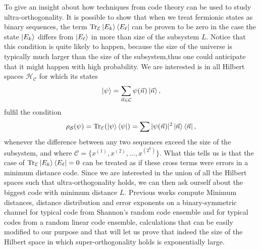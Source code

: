 \indent To give an insight about how techniques from code theory can be used to study ultra-orthogonality. It is possible to show that when we treat fermionic states as binary sequences, the term $\operatorname{Tr}_{\mathcal{E}}\mathinner{|{E_k}\rangle}\mathinner{\langle{E_\ell}|}$ can be proven to be zero in the case the state $\mathinner{|{E_k}\rangle}$ differs from $\mathinner{|{E_\ell}\rangle}$ in more than size of the subsystem $L$. Notice that this condition is quite likely to happen, because the size of the universe is typically much larger than the size of the subsystem,thus one could anticipate that it might happen with high probability. We are interested is in all Hilbert spaces $\mathcal{H}_{\mathcal{C}}$ for which its states 
\begin{equation}
\mathinner{|{\psi}\rangle} = \sum_{\vec{n}\in \mathcal{C}}\psi(\vec{n})\mathinner{|{\vec{n}}\rangle},
\end{equation}
fulfil the condition 
\begin{equation}
\rho_{\mathcal{S}}(\psi) = \operatorname{Tr}_{\mathcal{E}}(\mathinner{|{\psi}\rangle}\mathinner{\langle{\psi}|}) = \sum |\psi(\vec{n})|^2 \mathinner{|{\vec{n}}\rangle}\mathinner{\langle{\vec{n}}|},
\end{equation}
whenever the difference between any two sequences exceed the size of the subsystem, and where $\mathcal{C}=\{x^{(1)},x^{(2)},\ldots, x^{(2^k)}\}$. What this tells us is that the case of $\operatorname{Tr}_{\mathcal{E}}\mathinner{|{E_k}\rangle}\mathinner{\langle{E_\ell}|} = 0$ can be treated as if these cross terms were errors in a minimum distance code. Since we are interested in the union of all the Hilbert spaces such that ultra-orthogonality holds, we can then ask ourself about the biggest code with minimum distance $L$. Previous works \cite{barg_random_2002} compute Minimum distances, distance distribution and error exponents on a binary-symmetric channel for typical code from Shannon's random code ensemble and for typical codes from a random linear code ensemble, calculations that can be easily modified to our purpose and that will let us prove that indeed the size of the Hilbert space in which super-orthogonality holds is exponentially large.\\






